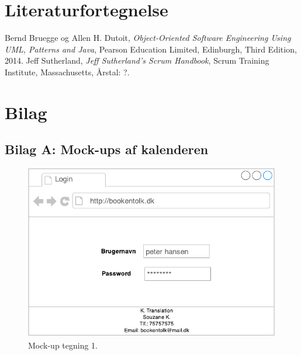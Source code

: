 \documentclass[12pt]{article}   %
\begin{document}
\pagebreak

\section{Literaturfortegnelse}
\begin{thebibliography}{9}
		Bernd Bruegge og Allen H. Dutoit,
		\emph{Object-Oriented Software Engineering Using UML, Patterns
		and Java},
		Pearson Education Limited, Edinburgh,
		Third Edition,
		2014.
		Jeff Sutherland,
		\emph{Jeff Sutherland's Scrum Handbook},
		Scrum Training Institute, Massachusetts,
		Årstal: ?.


\end{thebibliography}

\newpage

\section{Bilag}

\subsection{Bilag A: Mock-ups af kalenderen}

\begin{figure}[!ht]
\begin{center}
\includegraphics{mock1.pdf}
\caption{Mock-up tegning 1.}
\end{center}
\end{figure}


\newpage
\end{document}
